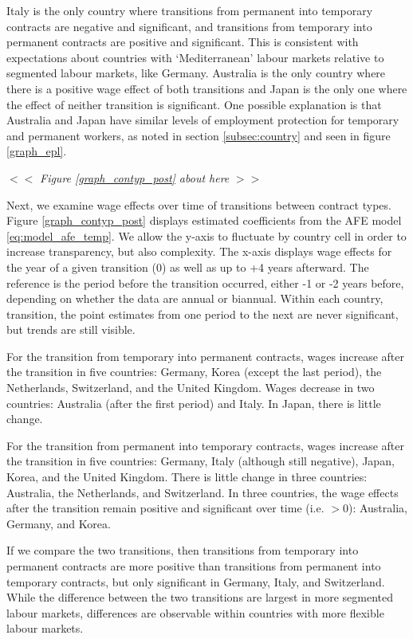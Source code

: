 \documentclass[12pt]{article}
\begin{document}
Italy is the only country where transitions from permanent into temporary contracts are negative and significant, and transitions from temporary into permanent contracts are positive and significant.  This is consistent with expectations about countries with `Mediterranean' labour markets relative to segmented labour markets, like Germany.  Australia is the only country where there is a positive wage effect of both transitions and Japan is the only one where the effect of neither transition is significant.  One possible explanation is that Australia and Japan have similar levels of employment protection for temporary and permanent workers, as noted in section \ref{subsec:country} and seen in figure \ref{graph_epl}.  

\begin{center}
$<<$ \emph{Figure \ref{graph_contyp_post} about here} $>>$
\end{center}

Next, we examine wage effects over time of transitions between contract types.  Figure \ref{graph_contyp_post} displays estimated coefficients from the AFE model \ref{eq:model_afe_temp}.  We allow the y-axis to fluctuate by country cell in order to increase transparency, but also complexity.  The x-axis displays wage effects for the year of a given transition (0) as well as up to +4 years afterward.  The reference is the period before the transition occurred, either -1 or -2 years before, depending on whether the data are annual or biannual.  Within each country, transition, the point estimates from one period to the next are never significant, but trends are still visible.  

For the transition from temporary into permanent contracts, wages increase after the transition in five countries: Germany, Korea (except the last period), the Netherlands, Switzerland, and the United Kingdom.  Wages decrease in two countries: Australia (after the first period) and Italy.  In Japan, there is little change.  

For the transition from permanent into temporary contracts, wages increase after the transition in five countries: Germany, Italy (although still negative), Japan, Korea, and the United Kingdom.  There is little change in three countries: Australia, the Netherlands, and Switzerland.  In three countries, the wage effects after the transition remain positive and significant over time (i.e. $>0$): Australia, Germany, and Korea.  

If we compare the two transitions, then transitions from temporary into permanent contracts are more positive than transitions from permanent into temporary contracts, but only significant in Germany, Italy, and Switzerland.   While the difference between the two transitions are largest in more segmented labour markets, differences are observable within countries with more flexible labour markets.  
\end{document}
